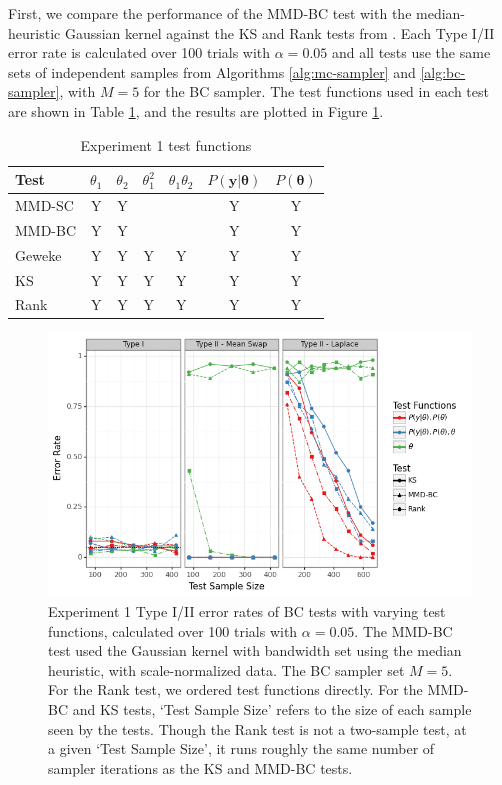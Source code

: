 \documentclass[a4paper,11pt]{article}
\begin{document}
First, we compare the performance of the MMD-BC test with the median-heuristic Gaussian kernel against the KS and Rank tests from \cite{gandy_unit_2020}. Each Type I/II error rate is calculated over 100 trials with $\alpha=0.05$ and all tests use the same sets of independent samples from Algorithms \ref{alg:mc-sampler} and \ref{alg:bc-sampler}, with $M=5$ for the BC sampler. The test functions used in each test are shown in Table \ref{tab:ex1_testfn}, and the results are plotted in Figure \ref{fig:ex1_aux}.

\begin{table}[H]
    \centering
    \begin{tabular}{l|c|c|c|c|c|c}
         Test  & $\theta_{1}$ & $\theta_{2}$ & $\theta_{1}^{2}$ & $\theta_{1}\theta_{2}$ & $P(\mathbf{y}|\mathbf{\theta})$ & $P(\mathbf{\theta})$ \\
         \hline
         MMD-SC & Y & Y & & & Y & Y \\
         MMD-BC & Y & Y & & & Y & Y \\
         Geweke & Y & Y & Y & Y & Y & Y \\
         KS & Y & Y & Y & Y & Y & Y \\
         Rank & Y & Y & Y & Y & Y & Y \\
    \end{tabular}
    \caption{Experiment 1 test functions}
    \label{tab:ex1_testfn}
\end{table}

\begin{figure}
    \centering
    \includegraphics[width=\textwidth]{figures/gandy_scott_aux.png}
    \caption{Experiment 1 Type I/II error rates of BC tests with varying test functions, calculated over 100 trials with $\alpha=0.05$. The MMD-BC test used the Gaussian kernel with bandwidth set using the median heuristic, with scale-normalized data. The BC sampler set $M=5$. For the Rank test, we ordered test functions directly. For the MMD-BC and KS tests, `Test Sample Size' refers to the size of each sample seen by the tests. Though the Rank test is not a two-sample test, at a given `Test Sample Size', it runs roughly the same number of sampler iterations as the KS and MMD-BC tests.}
    \label{fig:ex1_aux}
\end{figure}
\end{document}
